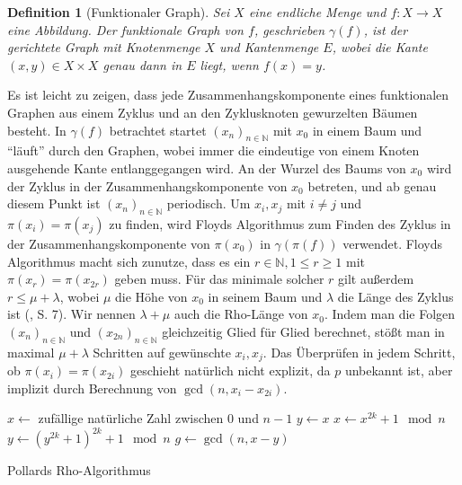 \documentclass[a4paper, 10pt, ngerman]{article}
\newcommand{\N}{\mathbb{N}}
\newtheorem{definition}{Definition}
\begin{document}
\begin{definition}[Funktionaler Graph]
    Sei $X$ eine endliche Menge und $f: X \to X$ eine Abbildung. Der funktionale Graph von $f$, geschrieben $\gamma(f)$, ist der gerichtete Graph mit Knotenmenge $X$ und Kantenmenge $E$, wobei die Kante $(x, y) \in X \times X$ genau dann in $E$ liegt, wenn $f(x) = y$.
\end{definition}

\noindent Es ist leicht zu zeigen, dass jede Zusammenhangskomponente eines funktionalen Graphen aus einem Zyklus und an den Zyklusknoten gewurzelten Bäumen besteht. In $\gamma(f)$ betrachtet startet $(x_n)_{n \in \N}$ mit $x_0$ in einem Baum und "`läuft"' durch den Graphen, wobei immer die eindeutige von einem Knoten ausgehende Kante entlanggegangen wird. An der Wurzel des Baums von $x_0$ wird der Zyklus in der Zusammenhangskomponente von $x_0$ betreten, und ab genau diesem Punkt ist $(x_n)_{n \in \N}$ periodisch. Um $x_i, x_j$ mit $i \ne j$ und $\pi(x_i) = \pi(x_j)$ zu finden, wird Floyds Algorithmus zum Finden des Zyklus in der Zusammenhangskomponente von $\pi(x_0)$ in $\gamma(\pi(f))$ verwendet. Floyds Algorithmus macht sich zunutze, dass es ein $r \in \N, 1 \le r \ge 1$ mit $\pi(x_r) = \pi(x_{2r})$ geben muss. Für das minimale solcher $r$ gilt außerdem $r \le \mu + \lambda$, wobei $\mu$ die Höhe von $x_0$ in seinem Baum und $\lambda$ die Länge des Zyklus ist (\cite{knu98}, S. 7). Wir nennen $\lambda + \mu$ auch die Rho-Länge von $x_0$. Indem man die Folgen $(x_n)_{n \in \N}$ und $(x_{2n})_{n \in \N}$ gleichzeitig Glied für Glied berechnet, stößt man in maximal $\mu + \lambda$ Schritten auf gewünschte $x_i, x_j$. Das Überprüfen in jedem Schritt, ob $\pi(x_i) = \pi(x_{2i})$ geschieht natürlich nicht explizit, da $p$ unbekannt ist, aber implizit durch Berechnung von $\gcd(n, x_i - x_{2i})$.

\begin{algorithm*}
    $x \gets $ zufällige natürliche Zahl zwischen $0$ und $n - 1$ \;
    $y \gets x$ \;
    {
        $x \gets x^{2k} + 1 \mod n$ \;
        $y \gets (y^{2k} + 1)^{2k} + 1 \mod n$ \;
        $g \gets \gcd(n, x - y)$ \;
        {
             \;
        }
    }

    \caption{Pollards Rho-Algorithmus}
\end{algorithm*}
\end{document}
